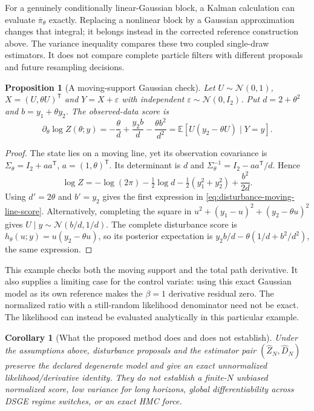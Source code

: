 \documentclass[11pt]{article}
\newtheorem{proposition}{Proposition}
\newtheorem{corollary}{Corollary}
\begin{document}
For a genuinely conditionally linear-Gaussian block, a Kalman calculation
can evaluate $\overline\pi_\theta$ exactly. Replacing a nonlinear block by a
Gaussian approximation changes that integral; it belongs instead in the
corrected reference construction above. The variance inequality compares
these two coupled single-draw estimators. It does not compare complete
particle filters with different proposals and future resampling decisions.

\begin{proposition}[A moving-support Gaussian check]
\label{prop:disturbance-moving-line}
Let $U\sim\mathcal N(0,1)$, $X=(U,\theta U)^{\mathsf T}$ and
$Y=X+\varepsilon$ with independent
$\varepsilon\sim\mathcal N(0,I_2)$. Put
$d=2+\theta^2$ and $b=y_1+\theta y_2$. The observed-data score is
\begin{equation}
 \partial_\theta\log Z(\theta;y)
 =-\frac{\theta}{d}+\frac{y_2b}{d}-\frac{\theta b^2}{d^2}
 =\mathbb E[U(y_2-\theta U)\mid Y=y].
 \label{eq:disturbance-moving-line-score}
\end{equation}
\end{proposition}

\begin{proof}
The state lies on a moving line, yet its observation covariance is
$\Sigma_\theta=I_2+aa^{\mathsf T}$, $a=(1,\theta)^{\mathsf T}$.
Its determinant is $d$ and
$\Sigma_\theta^{-1}=I_2-aa^{\mathsf T}/d$. Hence
\begin{equation}
 \log Z=-\log(2\pi)-\tfrac12\log d
        -\tfrac12(y_1^2+y_2^2)+\frac{b^2}{2d}.
 \label{eq:disturbance-moving-line-likelihood}
\end{equation}
Using $d'=2\theta$ and $b'=y_2$ gives the first expression in
\eqref{eq:disturbance-moving-line-score}. Alternatively, completing the
square in
$u^2+(y_1-u)^2+(y_2-\theta u)^2$ gives
$U\mid y\sim\mathcal N(b/d,1/d)$. The complete disturbance score is
$h_\theta(u;y)=u(y_2-\theta u)$, so its posterior expectation is
$y_2b/d-\theta(1/d+b^2/d^2)$, the same expression.
\end{proof}

This example checks both the moving support and the total path derivative.
It also supplies a limiting case for the control variate: using this exact
Gaussian model as its own reference makes the $\beta=1$ derivative residual
zero. The normalized ratio with a still-random likelihood denominator need
not be exact. The likelihood can instead be evaluated analytically in this
particular example.

\begin{corollary}[What the proposed method does and does not establish]
\label{cor:disturbance-scope}
Under the assumptions above, disturbance proposals and the estimator pair
$(\widehat Z_N,\widehat D_N)$ preserve the declared degenerate model and give
an exact unnormalized likelihood/derivative identity. They do not establish a
finite-$N$ unbiased normalized score, low variance for long horizons,
global differentiability across DSGE regime switches, or an exact HMC force.
\end{corollary}
\end{document}
